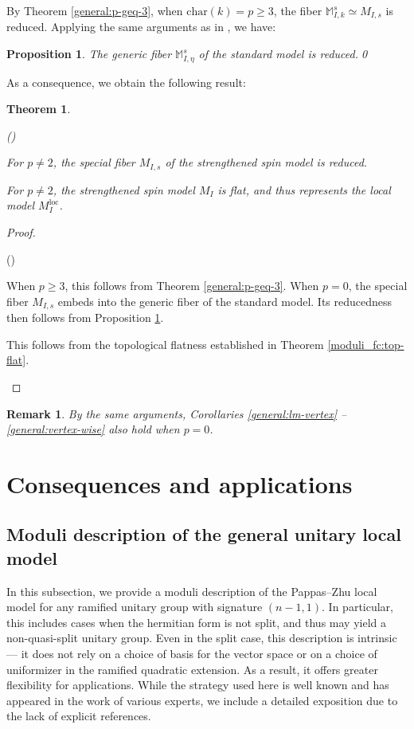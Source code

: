 \documentclass[pdflatex,sn-mathphys-num]{sn-jnl}%
\theoremstyle{thmstyleone}%
\newtheorem{theorem}[subsubsection]{Theorem}%
\newtheorem{proposition}[subsubsection]{Proposition}%
\theoremstyle{thmstyletwo}%
\newtheorem{remark}[subsubsection]{Remark}%
\numberwithin{equation}{subsection}
\theoremstyle{thmstylethree}%
\newcommand{\BM}{\ensuremath{\mathbb{M}}\xspace}
\newcommand{\loc}{\ensuremath{\mathrm{loc}}\xspace}
\newenvironment{altenumerate}
	{\begin{list}
			{(\theenumi) }
			{\usecounter{enumi}
				\setlength{\labelwidth}{0pt}
				\setlength{\labelsep}{0pt}
				\setlength{\leftmargin}{0pt}
				\setlength{\itemsep}{\the\smallskipamount}
				\renewcommand{\theenumi}{\roman{enumi}}
		}}
		{\end{list}}
\begin{document}
By Theorem \ref{general:p-geq-3}, when $\text{char}(k)=p\geq 3$, the fiber $\BM^s_{I,k}\simeq M_{I,s}$ is reduced.
Applying the same arguments as in \cite[Theorem 4.18]{Gortz2001}, we have:
\begin{proposition}\label{general_char-0_generic}
The generic fiber $\BM^s_{I,\eta}$ of the standard model is reduced.\qed
\end{proposition}
As a consequence, we obtain the following result:
\begin{theorem}
\begin{altenumerate}
\item For $p\neq 2$, the special fiber $M_{I,s}$ of the strengthened spin model is reduced.
\item For $p\neq 2$, the strengthened spin model $M_I$ is flat, and thus represents the local model $M_I^\loc$.
\end{altenumerate}
\end{theorem}
\begin{proof}
\begin{altenumerate}
\item When $p\geq 3$, this follows from Theorem \ref{general:p-geq-3}. 
When $p=0$, the special fiber $M_{I,s}$ embeds into the generic fiber of the standard model. Its reducedness then follows from Proposition \ref{general_char-0_generic}.
\item This follows from the topological flatness established in Theorem \ref{moduli_fc:top-flat}.
\end{altenumerate}
\end{proof}
\begin{remark}
By the same arguments, Corollaries \ref{general:lm-vertex} – \ref{general:vertex-wise} also hold when $p=0$.
\end{remark}
		
\section{Consequences and applications}\label{application}
\subsection{Moduli description of the general unitary local model}\label{application_nonsplit}
In this subsection, we provide a moduli description of the Pappas–Zhu local model for any ramified unitary group with signature $(n-1,1)$.
In particular, this includes cases when the hermitian form is not split, and thus may yield a non-quasi-split unitary group.
Even in the split case, this description is intrinsic — it does not rely on a choice of basis for the vector space or on a choice of uniformizer in the ramified quadratic extension.
As a result, it offers greater flexibility for applications.
While the strategy used here is well known and has appeared in the work of various experts, we include a detailed exposition due to the lack of explicit references.
		
\end{document}
